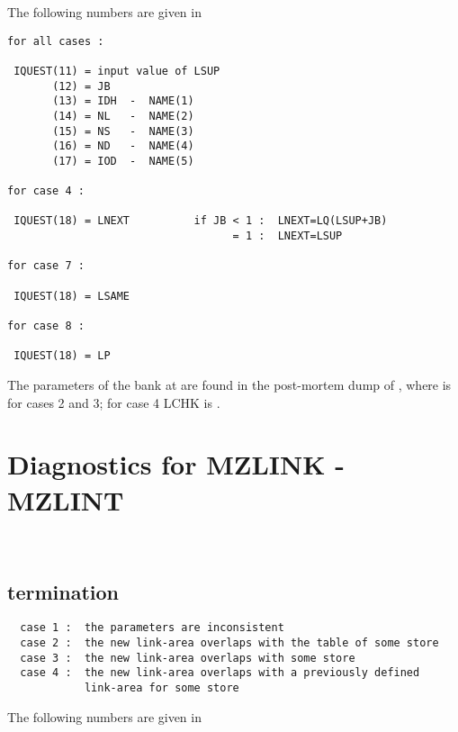 The following numbers are given in 

\begin{verbatim}
for all cases :

 IQUEST(11) = input value of LSUP
       (12) = JB
       (13) = IDH  -  NAME(1)
       (14) = NL   -  NAME(2)
       (15) = NS   -  NAME(3)
       (16) = ND   -  NAME(4)
       (17) = IOD  -  NAME(5)

for case 4 :

 IQUEST(18) = LNEXT          if JB < 1 :  LNEXT=LQ(LSUP+JB)
                                   = 1 :  LNEXT=LSUP

for case 7 :

 IQUEST(18) = LSAME

for case 8 :

 IQUEST(18) = LP
\end{verbatim}

The parameters of the bank at  are found in the post-mortem
dump of , where  is  for cases 2 and 3;
for case 4 LCHK is .

\section{Diagnostics for MZLINK - MZLINT}

\begin{flushleft}
\\
\end{flushleft}

\subsection*{ termination}

\begin{verbatim}
  case 1 :  the parameters are inconsistent
  case 2 :  the new link-area overlaps with the table of some store
  case 3 :  the new link-area overlaps with some store
  case 4 :  the new link-area overlaps with a previously defined
            link-area for some store
\end{verbatim}

The following numbers are given in 

